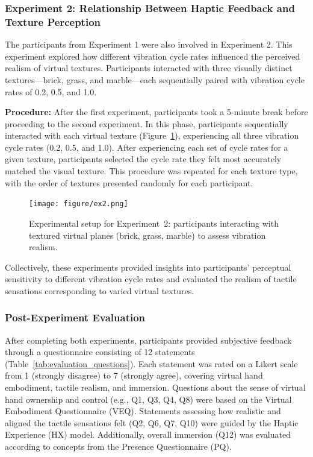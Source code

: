 \documentclass[graybox]{svmult}
\begin{document}
\subsubsection{Experiment 2: Relationship Between Haptic Feedback and Texture Perception}
The participants from Experiment 1 were also involved in Experiment 2. This experiment explored how different vibration cycle rates influenced the perceived realism of virtual textures. Participants interacted with three visually distinct textures—brick, grass, and marble—each sequentially paired with vibration cycle rates of 0.2, 0.5, and 1.0.

\textbf{Procedure:} After the first experiment, participants took a 5-minute break before proceeding to the second experiment. In this phase, participants sequentially interacted with each virtual texture (Figure~\ref{fig:experiment2_setup}), experiencing all three vibration cycle rates (0.2, 0.5, and 1.0). After experiencing each set of cycle rates for a given texture, participants selected the cycle rate they felt most accurately matched the visual texture. This procedure was repeated for each texture type, with the order of textures presented randomly for each participant.

\begin{figure}[H]
	\centering
	\texttt{[image: figure/ex2.png]}%
	\caption{Experimental setup for Experiment~2: participants interacting with textured virtual planes (brick, grass, marble) to assess vibration realism.}\label{fig:experiment2_setup}
\end{figure}

Collectively, these experiments provided insights into participants' perceptual sensitivity to different vibration cycle rates and evaluated the realism of tactile sensations corresponding to varied virtual textures.

\subsubsection{Post-Experiment Evaluation}
After completing both experiments, participants provided subjective feedback through a questionnaire consisting of 12 statements (Table~\ref{tab:evaluation_questions}). Each statement was rated on a Likert scale from 1 (strongly disagree) to 7 (strongly agree), covering virtual hand embodiment, tactile realism, and immersion. Questions about the sense of virtual hand ownership and control (e.g., Q1, Q3, Q4, Q8) were based on the Virtual Embodiment Questionnaire (VEQ). Statements assessing how realistic and aligned the tactile sensations felt (Q2, Q6, Q7, Q10) were guided by the Haptic Experience (HX) model. Additionally, overall immersion (Q12) was evaluated according to concepts from the Presence Questionnaire (PQ).
\end{document}
